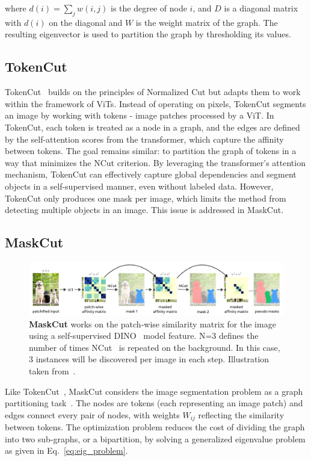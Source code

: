 where \( d(i) = \sum_{j} w(i, j) \) is the degree of node \( i \), and \( D \) is a diagonal matrix with \( d(i) \) on the diagonal and \( W \) is the weight matrix of the graph. The resulting eigenvector is used to partition the graph by thresholding its values.

\subsection{TokenCut}
TokenCut~\cite{wang2022tokencut} builds on the principles of Normalized Cut but adapts them to work within the framework of ViTs. Instead of operating on pixels, TokenCut segments an image by working with tokens - image patches processed by a ViT. In TokenCut, each token is treated as a node in a graph, and the edges are defined by the self-attention scores from the transformer, which capture the affinity between tokens. The goal remains similar: to partition the graph of tokens in a way that minimizes the NCut criterion. By leveraging the transformer’s attention mechanism, TokenCut can effectively capture global dependencies and segment objects in a self-supervised manner, even without labeled data. However, TokenCut only produces one mask per image, which limits the method from detecting multiple objects in an image. This issue is addressed in MaskCut.

\subsection{MaskCut}
\begin{figure}
	\centering
	\includegraphics[width=1.0\textwidth]{Images/main/maskcut_eg.png}
	\caption[\textbf{MaskCut Flow}]{\textbf{MaskCut} works on the patch-wise
		similarity matrix for the image using a self-supervised DINO~\cite{caron2021emerging} model feature. N=3 defines the number of times NCut~\cite{normcut} is repeated on the background. In this case, 3 instances will be discovered per image in each step. Illustration taken from~\cite{wang2023cut}.}
	\label{fig:maskcut_flow}
\end{figure}

Like TokenCut~\cite{wang2022tokencut}, MaskCut considers the image segmentation problem as a graph partitioning task~\cite{normcut}. The nodes are tokens (each representing an image patch) and edges connect every pair of nodes, with weights \(W_{ij}\) reflecting the similarity between tokens. The optimization problem reduces the cost of dividing the graph into two sub-graphs, or a bipartition, by solving a generalized eigenvalue problem as given in Eq.~\ref{eq:eig_problem}. 

